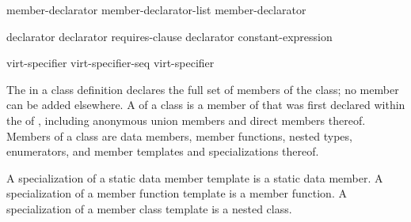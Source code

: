 \begin{bnf}
\br
    member-declarator\br
    member-declarator-list \terminal{,} member-declarator
\end{bnf}

\begin{bnf}
\br
    declarator  \br
    declarator requires-clause\br
    declarator \br
      \terminal{:} constant-expression 
\end{bnf}

\begin{bnf}
\br
    virt-specifier\br
    virt-specifier-seq virt-specifier
\end{bnf}

\begin{bnf}
\br
    \br
\end{bnf}

\begin{bnf}
\br
    \terminal{=} 
\end{bnf}

\pnum
{}%
The  in a class definition declares the
full set of members of the class; no member can be added elsewhere.
A  of a class  is a member of 
that was first declared within the  of ,
including anonymous union members and direct members thereof.
Members of a class are data members, member
functions, nested types, enumerators,
and member templates and specializations thereof.
\begin{note}
A specialization of a static data member template is a static data member.
A specialization of a member function template is a member function.
A specialization of a member class template is a nested class.
\end{note}

